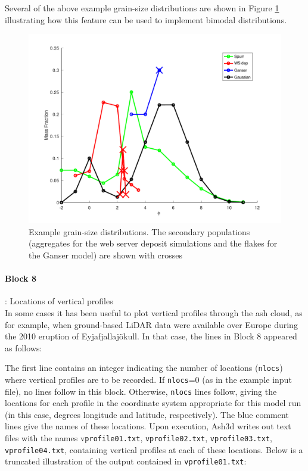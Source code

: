 Several of the above example grain-size distributions are shown in 
Figure \ref{FigInputGSD} 
illustrating how this feature can be used to implement bimodal distributions.
\begin{figure}[htbp]
\begin{center}
\includegraphics[angle=0,scale=0.7]{Figures/Scripts/InputGSD/FigInputGSD.pdf}
\parbox{15cm}{\caption{\label{FigInputGSD}
Example grain-size distributions.  The secondary populations (aggregates for the web
server deposit simulations and the flakes for the Ganser model) are shown with
crosses}}
\end{center}
\end{figure}

\paragraph{Block 8}: Locations of vertical profiles\\
In some cases it has been useful to plot vertical profiles through the ash cloud, as for
example, when ground-based LiDAR data were available over Europe during the 2010
eruption of Eyjafjallaj\"okull. In that case, the lines in Block 8 appeared as follows:

The first line contains an integer indicating the number of locations
(\texttt{nlocs}) where
vertical profiles are to be recorded. If \texttt{nlocs}=0 (as in the example input file), no
lines follow in this block. Otherwise, \texttt{nlocs} lines follow, giving the locations for
each profile in the coordinate system appropriate for this model run (in this case,
degrees longitude and latitude, respectively). The blue comment lines give the names
of these locations.
Upon execution, Ash3d writes out text files with the names v\texttt{profile01.txt},
\texttt{vprofile02.txt}, \texttt{vprofile03.txt}, \texttt{vprofile04.txt},
containing vertical profiles at each
of these locations. Below is a truncated illustration of the output contained in
\texttt{vprofile01.txt}:

